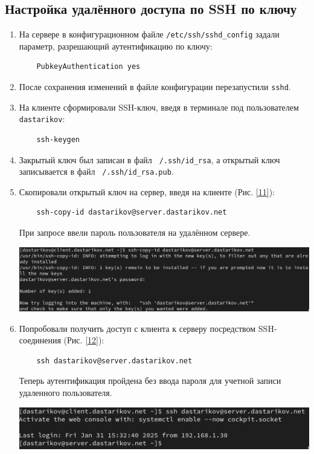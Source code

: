 \subsection{Настройка удалённого доступа по SSH по ключу}
\begin{enumerate}
\item На сервере в конфигурационном файле \texttt{/etc/ssh/sshd\_config} задали параметр, разрешающий аутентификацию по ключу:
  \begin{verbatim}
    PubkeyAuthentication yes
  \end{verbatim}
\item После сохранения изменений в файле конфигурации перезапустили \texttt{sshd}.
\item На клиенте сформировали SSH-ключ, введя в терминале под пользователем \texttt{dastarikov}:
  \begin{verbatim}
    ssh-keygen
  \end{verbatim}

\item Закрытый ключ был записан в файл \texttt{~/.ssh/id\_rsa}, а открытый ключ записывается в файл \texttt{~/.ssh/id\_rsa.pub}.
\item Скопировали открытый ключ на сервер, введя на клиенте (Рис. \ref{11}):
  \begin{verbatim}
    ssh-copy-id dastarikov@server.dastarikov.net
  \end{verbatim}
  При запросе ввели пароль пользователя на удалённом сервере.
\begin{center}
  \centering
  \includegraphics[width=\textwidth]{../images/image11.png}
  \label{11}
\end{center}

\item Попробовали получить доступ с клиента к серверу посредством SSH-соединения (Рис. \ref{12}):
  \begin{verbatim}
    ssh dastarikov@server.dastarikov.net
  \end{verbatim}
  Теперь аутентификация пройдена без ввода пароля для учетной записи удаленного пользователя.
\begin{center}
  \centering
  \includegraphics[width=\textwidth]{../images/image12.png}
  \label{12}
\end{center}

\end{enumerate}
